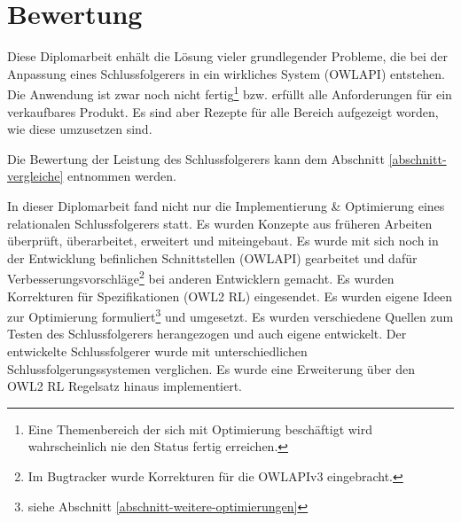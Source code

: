 \chapter{Bewertung}
Diese Diplomarbeit enhält die Lösung vieler grundlegender Probleme, die bei der Anpassung eines Schlussfolgerers in ein wirkliches System (OWLAPI) entstehen. Die Anwendung ist zwar noch nicht fertig\footnote{Eine Themenbereich der sich mit Optimierung beschäftigt wird wahrscheinlich nie den Status fertig erreichen.} bzw. erfüllt alle Anforderungen für ein verkaufbares Produkt. Es sind aber Rezepte für alle Bereich aufgezeigt worden, wie diese umzusetzen sind.

Die Bewertung der Leistung des Schlussfolgerers kann dem Abschnitt \ref{abschnitt-vergleiche} entnommen werden.

In dieser Diplomarbeit fand nicht nur die Implementierung \& Optimierung eines relationalen Schlussfolgerers statt. Es wurden Konzepte aus früheren Arbeiten überprüft, überarbeitet, erweitert und miteingebaut. Es wurde mit sich noch in der Entwicklung befinlichen Schnittstellen (OWLAPI) gearbeitet und dafür Verbesserungsvorschläge\footnote{Im Bugtracker wurde Korrekturen für die OWLAPIv3 eingebracht.} bei anderen Entwicklern gemacht. Es wurden Korrekturen für Spezifikationen (OWL2 RL) eingesendet. Es wurden eigene Ideen zur Optimierung formuliert\footnote{siehe Abschnitt \ref{abschnitt-weitere-optimierungen}} und umgesetzt. Es wurden verschiedene Quellen zum Testen des Schlussfolgerers herangezogen und auch eigene entwickelt. Der entwickelte Schlussfolgerer wurde mit unterschiedlichen Schlussfolgerungssystemen verglichen. Es wurde eine Erweiterung über den OWL2 RL Regelsatz hinaus implementiert.

